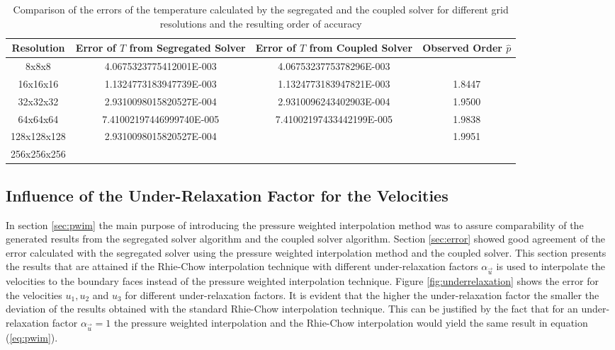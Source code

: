 \begin{table}[h!]\centering
{}
  \begin{tabular}{cccc}\toprule
    Resolution & Error of \(T\) from Segregated Solver & Error of \(T\) from Coupled Solver & Observed Order \(\hat{p}\) \\
    \midrule
    \rowcolor{black!20} 8x8x8       & 4.0675323775412001E-003   & 4.0675323775378296E-003  &        \\%
    \rowcolor{black!00} 16x16x16    & 1.1324773183947739E-003   & 1.1324773183947821E-003  & 1.8447 \\%
    \rowcolor{black!20} 32x32x32    & 2.9310098015820527E-004   & 2.9310096243402903E-004  & 1.9500 \\%
    \rowcolor{black!00} 64x64x64    & 7.41002197446999740E-005  & 7.41002197433442199E-005 & 1.9838 \\%
    \rowcolor{black!20} 128x128x128 & 2.9310098015820527E-004   &                          & 1.9951 \\%
    \rowcolor{black!00} 256x256x256 &                           &                          &        \\%
  \end{tabular}
  \caption{Comparison of the errors of the temperature calculated by the segregated and the coupled solver for different grid resolutions and the resulting order of accuracy}
\end{table}
\subsection{Influence of the Under-Relaxation Factor for the Velocities}
\label{sec:independence}

In section \ref{sec:pwim} the main purpose of introducing the pressure weighted interpolation method was to assure comparability of the generated results from the segregated solver algorithm and the coupled solver algorithm. Section \ref{sec:error} showed good agreement of the error calculated with the segregated solver using the pressure weighted interpolation method and the coupled solver. This section presents the results that are attained if the Rhie-Chow interpolation technique with different under-relaxation factors \(\alpha_\vec{u}\) is used to interpolate the velocities to the boundary faces instead of the pressure weighted interpolation technique. Figure \ref{fig:underrelaxation} shows the error for the velocities \(u_1, u_2\) and \(u_3\) for different under-relaxation factors. It is evident that the higher the under-relaxation factor the smaller the deviation of the results obtained with the standard Rhie-Chow interpolation technique. This can be justified by the fact that for an under-relaxation factor \(\alpha_\vec{u} = 1\) the pressure weighted interpolation and the Rhie-Chow interpolation would yield the same result in equation (\ref{eq:pwim}).

